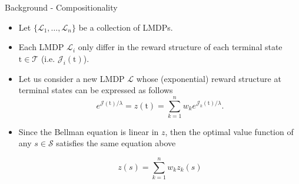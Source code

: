\documentclass{beamer}
\theoremstyle{mystyle}
\newcommand{\tS}{\text{t}}   %
\newcommand{\cJ}{\mathcal{J}}
\newcommand{\cL}{\mathcal{L}}
\newcommand{\cS}{\mathcal{S}}
\newcommand{\cT}{\mathcal{T}}
\begin{document}
\begin{frame}{Background - Compositionality}
    \begin{itemize}
    \item Let $\{\cL_1,\ldots,\cL_n\}$ be a collection of LMDPs. 
   
    \item Each LMDP $\cL_i$ only differ in the reward structure of each terminal state $\tS\in\cT$ (i.e. $\cJ_i(\tS)$).
    
    \item Let us consider a new LMDP $\cL$ whose (exponential) reward structure at terminal states can be expressed as follows~\cite{TodorovNIPS2009} 
    \begin{equation*}
        e^{\cJ(\tS)/\lambda} = z(\tS) = \sum_{k=1}^n w_k e^{\cJ_k(\tS)/\lambda}.
    \end{equation*}
    
    \item Since the Bellman equation is linear in $z$, then the optimal value function of any $s \in \cS$ satisfies the same equation above
    
    \begin{equation*}
       z(s) =  \sum_{k=1}^n w_k z_k(s) 
    \end{equation*}
    
    \end{itemize}
    
\end{frame}
\end{document}

